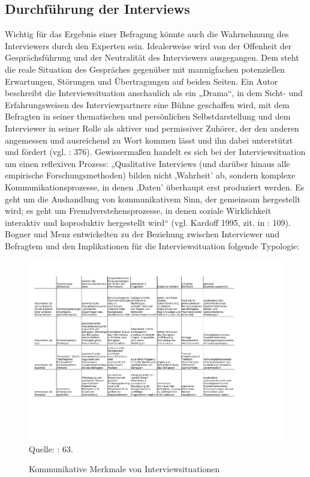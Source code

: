 \subsection{Durchführung der Interviews} 
Wichtig für das Ergebnis einer Befragung könnte auch die Wahrnehmung des Interviewers durch den Experten sein. Idealerweise wird von der Offenheit der Gesprächsführung und der Neutralität des Interviewers ausgegangen. Dem steht die reale Situation des Gespräches gegenüber mit mannigfachen potenziellen Erwartungen, Störungen und Übertragungen auf beiden Seiten. Ein Autor beschreibt die Interviewsituation anschaulich als ein „Drama“, in dem Sicht- und Erfahrungsweisen des Interviewpartners eine Bühne geschaffen wird, mit dem Befragten in seiner thematischen und persönlichen Selbstdarstellung und dem Interviewer in seiner Rolle als aktiver und permissiver Zuhörer, der den anderen angemessen und ausreichend zu Wort kommen lässt und ihn dabei unterstützt und fördert (vgl. \cite{herm00} : 376). Gewissermaßen handelt es sich bei der Interviewsituation um einen reflexiven Prozess: „Qualitative Interviews (und darüber hinaus alle empirische Forschungsmethoden) bilden nicht ‚Wahrheit’ ab, sondern komplexe Kommunikationsprozesse, in denen ‚Daten’ überhaupt erst produziert werden. Es geht um die Aushandlung von kommunikativem Sinn, der gemeinsam hergestellt wird; es geht um Fremdverstehensprozesse, in denen soziale Wirklichkeit interaktiv und koproduktiv hergestellt wird“ (vgl. Kardoff 1995, zit. in \cite{kruse} : 109). Bogner und Menz entwickelten zu der Beziehung zwischen Interviewer und Befragtem und den Implikationen für die Interviewsituation folgende Typologie:
\begin{figure}[H]
\caption{Kommunikative Merkmale von Interviewsituationen}
\includegraphics[width=7in,trim=0 100 0 0]{Material/Interviewsituationen.pdf}
\scriptsize{Quelle: \cite{bogmenz} : 63.}
\end{figure}
